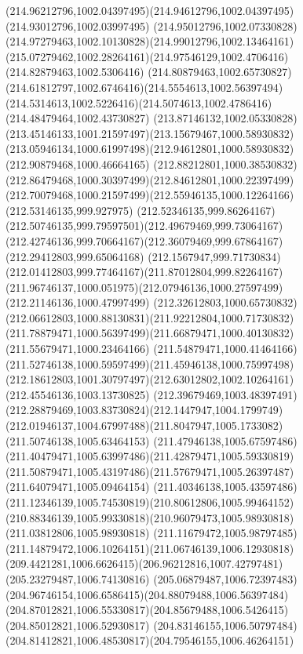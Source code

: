 {{  \curveto(214.96212796,1002.04397495)(214.94612796,1002.04397495)(214.93012796,1002.03997495)
  \curveto(214.95012796,1002.07330828)(214.97279463,1002.10130828)(214.99012796,1002.13464161)
  \curveto(215.07279462,1002.28264161)(214.97546129,1002.4706416)(214.82879463,1002.5306416)
  \curveto(214.80879463,1002.65730827)(214.61812797,1002.6746416)(214.5554613,1002.56397494)
  \curveto(214.5314613,1002.5226416)(214.5074613,1002.4786416)(214.48479464,1002.43730827)
  \curveto(213.87146132,1002.05330828)(213.45146133,1001.21597497)(213.15679467,1000.58930832)
  \curveto(213.05946134,1000.61997498)(212.94612801,1000.58930832)(212.90879468,1000.46664165)
  \curveto(212.88212801,1000.38530832)(212.86479468,1000.30397499)(212.84612801,1000.22397499)
  \curveto(212.70079468,1000.21597499)(212.55946135,1000.12264166)(212.53146135,999.927975)
  \curveto(212.52346135,999.86264167)(212.50746135,999.79597501)(212.49679469,999.73064167)
  \curveto(212.42746136,999.70664167)(212.36079469,999.67864167)(212.29412803,999.65064168)
  \curveto(212.1567947,999.71730834)(212.01412803,999.77464167)(211.87012804,999.82264167)
  \curveto(211.96746137,1000.051975)(212.07946136,1000.27597499)(212.21146136,1000.47997499)
  \curveto(212.32612803,1000.65730832)(212.06612803,1000.88130831)(211.92212804,1000.71730832)
  \curveto(211.78879471,1000.56397499)(211.66879471,1000.40130832)(211.55679471,1000.23464166)
  \curveto(211.54879471,1000.41464166)(211.52746138,1000.59597499)(211.45946138,1000.75997498)
  \curveto(212.18612803,1001.30797497)(212.63012802,1002.10264161)(212.45546136,1003.13730825)
  \curveto(212.39679469,1003.48397491)(212.28879469,1003.83730824)(212.1447947,1004.1799749)
  \curveto(212.01946137,1004.67997488)(211.8047947,1005.1733082)(211.50746138,1005.63464153)
  \curveto(211.47946138,1005.67597486)(211.40479471,1005.63997486)(211.42879471,1005.59330819)
  \curveto(211.50879471,1005.43197486)(211.57679471,1005.26397487)(211.64079471,1005.09464154)
  \curveto(211.40346138,1005.43597486)(211.12346139,1005.74530819)(210.80612806,1005.99464152)
  \curveto(210.88346139,1005.99330818)(210.96079473,1005.98930818)(211.03812806,1005.98930818)
  \curveto(211.11679472,1005.98797485)(211.14879472,1006.10264151)(211.06746139,1006.12930818)
  \curveto(209.4421281,1006.6626415)(206.96212816,1007.42797481)(205.23279487,1006.74130816)
  \curveto(205.06879487,1006.72397483)(204.96746154,1006.6586415)(204.88079488,1006.56397484)
  \curveto(204.87012821,1006.55330817)(204.85679488,1006.5426415)(204.85012821,1006.52930817)
  \curveto(204.83146155,1006.50797484)(204.81412821,1006.48530817)(204.79546155,1006.46264151)
}}
